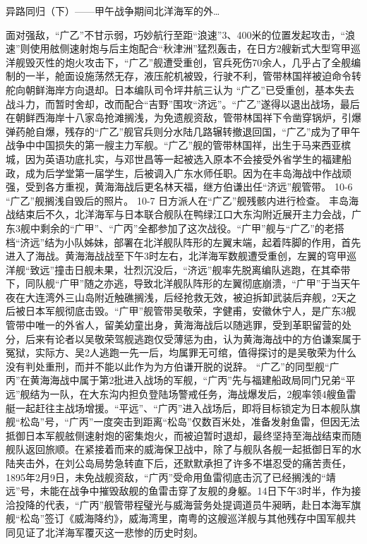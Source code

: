 \documentclass[12pt,UTF8]{ctexbook}
\begin{document}
异路同归（下）——甲午战争期间北洋海军的外…

面对强敌，“广乙”不甘示弱，巧妙航行至距“浪速”3、400米的位置发起攻击，“浪速”则使用舷侧速射炮与后主炮配合“秋津洲”猛烈轰击，在日方2艘新式大型穹甲巡洋舰毁灭性的炮火攻击下，“广乙”舰遭受重创，官兵死伤70余人，几乎占了全舰编制的一半，舱面设施荡然无存，液压舵机被毁，行驶不利，管带林国祥被迫命令转舵向朝鲜海岸方向退却。日本编队司令坪井航三认为 “广乙”已受重创，基本失去战斗力，而暂时舍却，改而配合“吉野”围攻“济远”。“广乙”遂得以退出战场，最后在朝鲜西海岸十八家岛抢滩搁浅，为免遗舰资敌，管带林国祥下令凿穿锅炉，引爆弹药舱自爆，残存的“广乙”舰官兵则分水陆几路辗转撤退回国，“广乙”成为了甲午战争中中国损失的第一艘主力军舰。“广乙”舰的管带林国祥，出生于马来西亚槟城，因为英语功底扎实，与邓世昌等一起被选入原本不会接受外省学生的福建船政，成为后学堂第一届学生，后被调入广东水师任职。因为在丰岛海战中作战顽强，受到各方重视，黄海海战后更名林天福，继方伯谦出任“济远”舰管带。
10-6 “广乙”舰搁浅自毁后的照片。
10-7 日方派人在“广乙”舰残骸内进行检查。
丰岛海战结束后不久，北洋海军与日本联合舰队在鸭绿江口大东沟附近展开主力会战，广东3舰中剩余的“广甲”、“广丙”全都参加了这次战役。“广甲”舰与“广乙”的老搭档“济远”结为小队姊妹，部署在北洋舰队阵形的左翼末端，起着阵脚的作用，首先进入了海战。黄海海战战至下午3时左右，北洋海军数舰遭受重创，左翼的穹甲巡洋舰“致远”撞击日舰未果，壮烈沉没后，“济远”舰率先脱离编队逃跑，在其牵带下，同队舰“广甲”随之亦逃，导致北洋舰队阵形的左翼彻底崩溃，“广甲”于当天午夜在大连湾外三山岛附近触礁搁浅，后经抢救无效，被迫拆卸武装后弃舰，2天之后被日本军舰彻底击毁。“广甲”舰管带吴敬荣，字健甫，安徽休宁人，是广东3舰管带中唯一的外省人，留美幼童出身，黄海海战后以随逃罪，受到革职留营的处分，后来有论者以吴敬荣驾舰逃跑仅受薄惩为由，认为黄海海战中的方伯谦案属于冤狱，实际方、吴2人逃跑一先一后，均属罪无可绾，值得探讨的是吴敬荣为什么没有判处重刑，而并不能以此作为为方伯谦开脱的说辞。
“广乙”的同型舰“广丙”在黄海海战中属于第2批进入战场的军舰，“广丙”先与福建船政局同门兄弟“平远”舰结为一队，在大东沟内担负登陆场警戒任务，海战爆发后，2舰率领4艘鱼雷艇一起赶往主战场增援。“平远”、“广丙”进入战场后，即将目标锁定为日本舰队旗舰“松岛”号，“广丙”一度突击到距离“松岛”仅数百米处，准备发射鱼雷，但因无法抵御日本军舰舷侧速射炮的密集炮火，而被迫暂时退却，最终坚持至海战结束而随舰队返回旅顺。在紧接着而来的威海保卫战中，除了与舰队各舰一起抵御日军的水陆夹击外，在刘公岛局势急转直下后，还默默承担了许多不堪忍受的痛苦责任，1895年2月9日，未免战舰资敌，“广丙”受命用鱼雷彻底击沉了已经搁浅的“靖远”号，未能在战争中摧毁敌舰的鱼雷击穿了友舰的身躯。14日下午3时半，作为接洽投降的代表，“广丙”舰管带程璧光与威海营务处提调道员牛昶昞，赴日本海军旗舰“松岛”签订《威海降约》，威海湾里，南粤的这艘巡洋舰与其他残存中国军舰共同见证了北洋海军覆灭这一悲惨的历史时刻。
\end{document}

